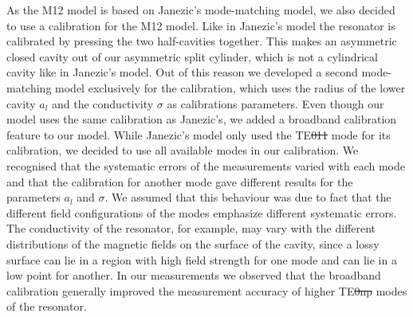 As the M12 model is based on Janezic's mode-matching model, we also decided to use a calibration for the M12 model. Like in Janezic's model the resonator is calibrated by pressing the two half-cavities together. This makes an asymmetric closed cavity out of our asymmetric split cylinder, which is not a cylindrical cavity like in Janezic's model. Out of this reason we developed a second mode-matching model exclusively for the calibration, which uses the radius of the lower cavity $a_l$ and the conductivity $\sigma$ as calibrations parameters. Even though our model uses the same calibration as Janezic's, we added a broadband calibration feature to our model. While Janezic's model only used the TE\st{011} mode for its calibration, we decided to use all available modes in our calibration. We recognised that the systematic errors of the measurements varied with each mode and that the calibration for another mode gave different results for the parameters $a_l$ and $\sigma$. We assumed that this behaviour was due to fact that the different field configurations of the modes emphasize different systematic errors. The conductivity of the resonator, for example, may vary with the different distributions of the magnetic fields on the surface of the cavity, since a lossy surface can lie in a region with high field strength for one mode and can lie in a low point for another. In our measurements we observed that the broadband calibration generally improved the measurement accuracy of higher TE\st{0np} modes of the resonator.

